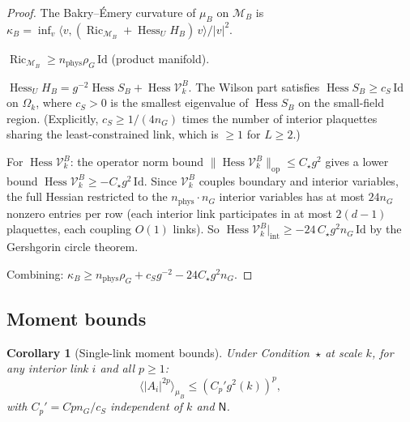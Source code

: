 \documentclass[11pt,a4paper]{article}
\theoremstyle{plain}
\newtheorem{corollary}[theorem]{Corollary}
\theoremstyle{definition}
\theoremstyle{remark}
\newcommand{\Hess}{\operatorname{Hess}}
\newcommand{\Ric}{\operatorname{Ric}}
\newcommand{\cM}{\mathcal{M}}
\newcommand{\cV}{\mathcal{V}}
\begin{document}
\begin{proof}
The Bakry--\'Emery curvature of $\mu_B$ on $\cM_B$ is
$\kappa_B = \inf_v \langle v, (\Ric_{\cM_B} + \Hess_U H_B)\,v
\rangle / |v|^2$.

$\Ric_{\cM_B} \ge n_{\mathrm{phys}}\rho_G\,\mathrm{Id}$ (product
manifold).

$\Hess_U H_B = g^{-2}\Hess S_B + \Hess\cV_k^B$. The Wilson
part satisfies $\Hess S_B \ge c_S\,\mathrm{Id}$ on $\Omega_k$,
where $c_S > 0$ is the smallest eigenvalue of $\Hess S_B$ on
the small-field region. (Explicitly, $c_S \ge 1/(4n_G)$
times the number of interior plaquettes sharing the
least-constrained link, which is $\ge 1$ for $L \ge 2$.)

For $\Hess\cV_k^B$: the operator norm bound
$\|\Hess\cV_k^B\|_{\mathrm{op}} \le C_\star g^2$ gives a
lower bound $\Hess\cV_k^B \ge -C_\star g^2\,\mathrm{Id}$.
Since $\cV_k^B$ couples boundary and interior variables,
the full Hessian restricted to the $n_{\mathrm{phys}}\cdot n_G$
interior variables has at most $24 n_G$ nonzero entries
per row (each interior link participates in at most $2(d-1)$
plaquettes, each coupling $O(1)$ links). So
$\Hess\cV_k^B|_{\mathrm{int}} \ge -24\,C_\star g^2 n_G\,
\mathrm{Id}$ by the Gershgorin circle theorem.

Combining: $\kappa_B \ge n_{\mathrm{phys}}\rho_G + c_S g^{-2}
- 24 C_\star g^2 n_G$.
\end{proof}

\subsection{Moment bounds}

\begin{corollary}[Single-link moment bounds]
\label{cor:moments}
Under Condition~$\star$ at scale $k$, for any interior
link $i$ and all $p \ge 1$:
\begin{equation}
  \langle|A_i|^{2p}\rangle_{\mu_B}
  \le (C_p' g^2(k))^p,
\end{equation}
with $C_p' = Cpn_G/c_S$ independent of $k$ and $\mathsf{N}$.
\end{corollary}
\end{document}
